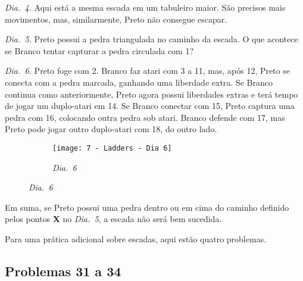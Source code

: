 \emph{Dia.\@~4.} Aqui está a mesma escada em um tabuleiro maior. São precisos mais movimentos, mas, similarmente, Preto não consegue escapar.

\emph{Dia.\@~5.} Preto possui a pedra triangulada no caminho da escada. O que acontece se Branco tentar capturar a pedra circulada com 1?

\emph{Dia.\@~6.} Preto foge com 2. Branco faz atari com 3 a 11, mas, após 12, Preto se conecta com a pedra marcada, ganhando uma liberdade extra. Se Branco continua como anteriormente, Preto agora possui liberdades extras e terá tempo de jogar um duplo-atari em 14. Se Branco conectar com 15, Preto captura uma pedra com 16, colocando outra pedra sob atari. Branco defende com 17, mas Preto pode jogar outro duplo-atari com 18, do outro lado.

\begin{figure}[h!]
    \centering
    \begin{subfigure}[t]{.3\textwidth}
        \centering
        \texttt{[image: 7 - Ladders - Dia 6]}
        \caption*{\emph{Dia.\@~6}}
    \end{subfigure}
\end{figure}

Em suma, se Preto possui uma pedra dentro ou em cima do caminho definido pelos pontos \textbf{X} no \emph{Dia.\@~5}, a escada não será bem sucedida.

Para uma prática adicional sobre escadas, aqui estão quatro problemas.

\pagebreak

\subsection{Problemas 31 a 34}

